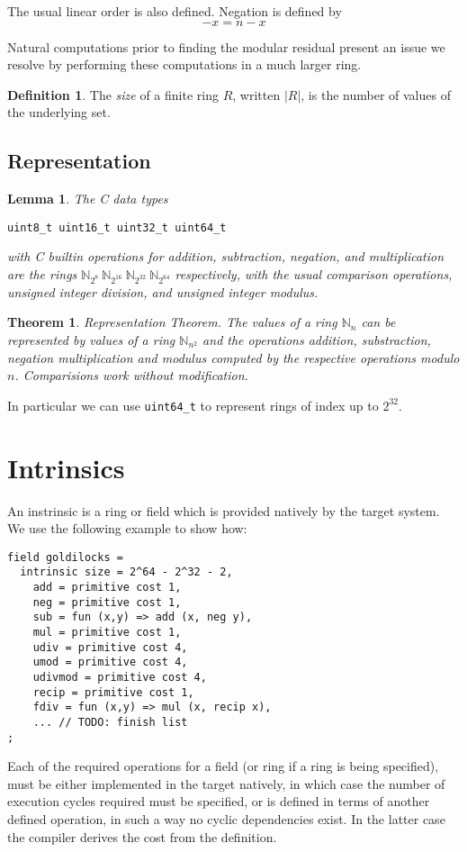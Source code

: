 \documentclass[oneside]{book}
\theoremstyle{plain}
\theoremstyle{definition}
\newtheorem{definition}{Definition}
\theoremstyle{plain}
\newtheorem{lemma}{Lemma}
\newtheorem{theorem}{Theorem}
\begin{document}
The usual linear order is also defined.  Negation is defined by
$$-x = n - x$$

Natural computations prior to finding the modular residual present an issue
we resolve by performing these computations in a much larger ring.

\begin{definition}
The {\em size} of a finite ring $R$, written $|R|$, is the number of values of the underlying set.
\end{definition}
\subsection{Representation}
\begin{lemma} The C data types
\begin{verbatim}
uint8_t uint16_t uint32_t uint64_t
\end{verbatim}
with C builtin operations for addition, subtraction, negation, and multiplication
are the rings
\(\mathbb{N}_{2^8}\ \mathbb{N}_{2^{16}}\ \mathbb{N}_{2^{32}}\ \mathbb{N}_{2^{64}} \)
respectively, with the usual comparison operations, unsigned integer division,
and unsigned integer modulus.
\end{lemma}

\begin{theorem}
{\em Representation Theorem}. The values of a ring $\mathbb{N}_n$ can be represented
by values of a ring $\mathbb{N}_{n^2}$ and the operations addition, substraction, negation
multiplication and modulus computed by the respective operations modulo $n$. Comparisions
work without modification.
\end{theorem}
In particular we can use \verb$uint64_t$ to represent rings of index up to 
$2^{32}$.

\section{Intrinsics}
An instrinsic is a ring or field which is provided natively by the target system.
We use the following example to show how:
\begin{verbatim}
field goldilocks = 
  intrinsic size = 2^64 - 2^32 - 2, 
    add = primitive cost 1,
    neg = primitive cost 1,
    sub = fun (x,y) => add (x, neg y),
    mul = primitive cost 1,
    udiv = primitive cost 4,
    umod = primitive cost 4,
    udivmod = primitive cost 4,
    recip = primitive cost 1,
    fdiv = fun (x,y) => mul (x, recip x),
    ... // TODO: finish list
;
\end{verbatim}
Each of the required operations for a field (or ring if a ring is being specified),
must be either implemented in the target natively, in which case the number of
execution cycles required must be specified, or is defined in terms of another
defined operation, in such a way no cyclic dependencies exist. In the latter case
the compiler derives the cost from the definition.
\end{document}
